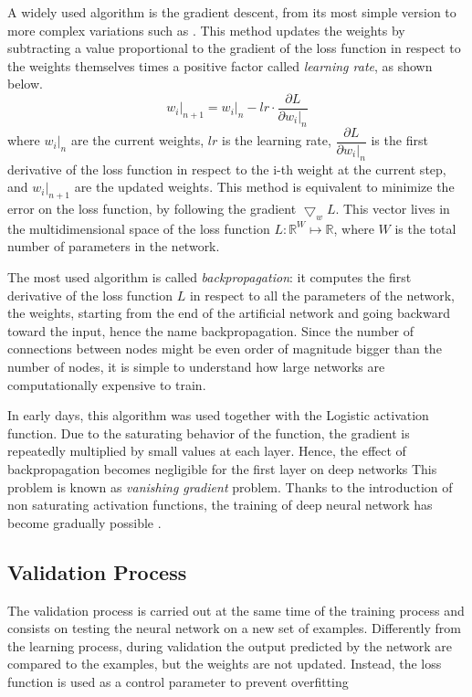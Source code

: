 A widely used algorithm is the gradient descent, from its most simple version to more complex variations such as .
This method updates the weights by subtracting a value proportional to the gradient of the loss function in respect to the weights themselves times a positive factor called \textit{learning rate}, as shown below.
\begin{equation}
	\left.w_i\right|_{n+1} = \left.w_i\right|_n - lr \cdot \frac{\partial L}{\partial \left.w_i\right|_n}
\end{equation}
where $\left.w_i\right|_{n}$ are the current weights, $lr$ is the learning rate, $\dfrac{\partial L}{\partial \left.w_i\right|_n}$ is the first derivative of the loss function in respect to the i-th weight at the current step, and $\left.w_i\right|_{n+1}$ are the updated weights.
This method is equivalent to minimize the error on the loss function, by following the gradient $\bigtriangledown_w L$.
This vector lives in the multidimensional space of the loss function $L:\mathbb{R}^W \mapsto \mathbb{R}$, where $W$ is the total number of parameters in the network.

The most used algorithm is called \textit{backpropagation}: it computes the first derivative of the loss function $L$ in respect to all the parameters of the network, the weights, starting from the end of the artificial network and going backward toward the input, hence the name backpropagation.
Since the number of connections between nodes might be even order of magnitude bigger than the number of nodes, it is simple to understand how large networks are computationally expensive to train.

In early days, this algorithm was used together with the Logistic activation function.
Due to the saturating behavior of the function, the gradient is repeatedly multiplied by small values at each layer.
Hence, the effect of backpropagation becomes negligible for the first layer on deep networks
This problem is known as \textit{vanishing gradient} problem.
Thanks to the introduction of non saturating activation functions, the training of deep neural network has become gradually possible \cite{krizhevsky2012imagenet}.

\subsection{Validation Process}
\label{ssec:Validation_Process}
The validation process is carried out at the same time of the training process and consists on testing the neural network on a new set of examples.
Differently from the learning process, during validation the output predicted by the network are compared to the examples, but the weights are not updated.
Instead, the loss function is used as a control parameter to prevent overfitting

